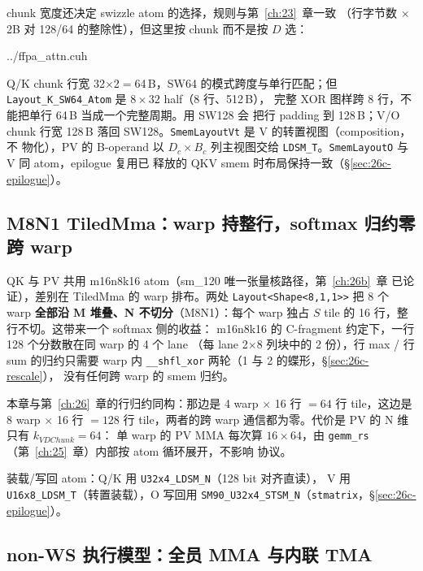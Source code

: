 chunk 宽度还决定 swizzle atom 的选择，规则与第~\ref{ch:23}~章一致
（行字节数 $\times$ 2B 对 128/64 的整除性），但这里按 chunk 而不是按
$D$ 选：

\begin{lstinputlisting}[linerange={730-756},firstnumber=auto,
  title={ffpa\_attn.cuh L730-756（chunk 尺寸决定 swizzle；M8N1 双 TiledMma；装载/写回 atom）}]{../ffpa_attn.cuh}
\end{lstinputlisting}

Q/K chunk 行宽 32$\times$2$=$64\,B，SW64 的模式跨度与单行匹配；但
\texttt{Layout\_K\_SW64\_Atom} 是 $8\times32$ half（8 行、512\,B），
完整 XOR 图样跨 8 行，不能把单行 64\,B 当成一个完整周期。用 SW128 会
把行 padding 到 128\,B；V/O chunk 行宽 128\,B 落回 SW128。\texttt{SmemLayoutVt} 是 V 的转置视图（composition，不
物化），PV 的 B-operand 以 $D_c \times B_c$ 列主视图交给
\texttt{LDSM\_T}。\texttt{SmemLayoutO} 与 V 同 atom，epilogue 复用已
释放的 QKV smem 时布局保持一致（\S\ref{sec:26c-epilogue}）。

\subsection{M8N1 TiledMma：warp 持整行，softmax 归约零跨 warp}\label{sec:26c-mma}

QK 与 PV 共用 m16n8k16 atom（sm\_120 唯一张量核路径，第~\ref{ch:26b}~章
已论证），差别在 TiledMma 的 warp 排布。两处 \texttt{Layout<Shape<8,1,1>>}
把 8 个 warp \textbf{全部沿 M 堆叠、N 不切分}（M8N1）：每个 warp 独占
$S$ tile 的 16 行，整行不切。这带来一个 softmax 侧的收益：
m16n8k16 的 C-fragment 约定下，一行 128 个分数散在同 warp 的 4 个 lane
（每 lane 2$\times$8 列块中的 2 份），行 max / 行 sum 的归约只需要
warp 内 \texttt{\_\_shfl\_xor} 两轮（1 与 2 的蝶形，\S\ref{sec:26c-rescale}），
没有任何跨 warp 的 smem 归约。

本章与第~\ref{ch:26}~章的行归约同构：那边是 4 warp $\times$ 16 行 $= 64$
行 tile，这边是 8 warp $\times$ 16 行 $= 128$ 行 tile，两者的跨 warp
通信都为零。代价是 PV 的 N 维只有 $k_{VDChunk}{=}64$：
单 warp 的 PV MMA 每次算 $16\times64$，由
\texttt{gemm\_rs}（第~\ref{ch:25}~章）内部按 atom 循环展开，不影响
协议。

装载/写回 atom：Q/K 用 \texttt{U32x4\_LDSM\_N}（128 bit 对齐直读），
V 用 \texttt{U16x8\_LDSM\_T}（转置装载），O 写回用
\texttt{SM90\_U32x4\_STSM\_N}（\texttt{stmatrix}，\S\ref{sec:26c-epilogue}）。

\subsection{non-WS 执行模型：全员 MMA 与内联 TMA}\label{sec:26c-nonws}

